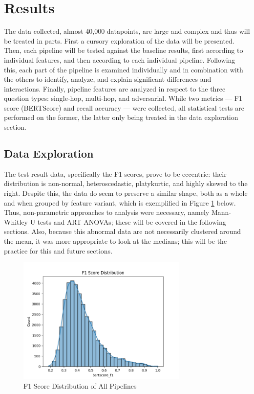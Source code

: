 \section{Results}

The data collected, almost 40,000 datapoints, are large and complex and thus will be treated in parts. First a cursory exploration of the data will be presented. Then, each pipeline will be tested against the baseline results, first according to individual features, and then according to each individual pipeline. Following this, each part of the pipeline is examined individually and in combination with the others to identify, analyze, and explain significant differences and interactions. Finally, pipeline features are analyzed in respect to the three question types: single-hop, multi-hop, and adversarial. While two metrics — F1 score (BERTScore) and recall accuracy — were collected, all statistical tests are performed on the former, the latter only being treated in the data exploration section.



\subsection{Data Exploration}

The test result data, specifically the F1 scores, prove to be eccentric: their distribution is non-normal, heteroscedastic, platykurtic, and highly skewed to the right. Despite this, the data do seem to preserve a similar shape, both as a whole and when grouped by feature variant, which is exemplified in Figure \ref{fig:f1_score_distribution_all} below. Thus, non-parametric approaches to analysis were necessary, namely Mann-Whitley U tests and ART ANOVAs; these will be covered in the following sections. Also, because this abnormal data are not necessarily clustered around the mean, it was more appropriate to look at the medians; this will be the practice for this and future sections.

\begin{figure}[p]
\centering
\includegraphics[width=0.75\textwidth]{charts/f1_score_distribution_all.png}
\caption{F1 Score Distribution of All Pipelines}
\label{fig:f1_score_distribution_all}
\end{figure}


